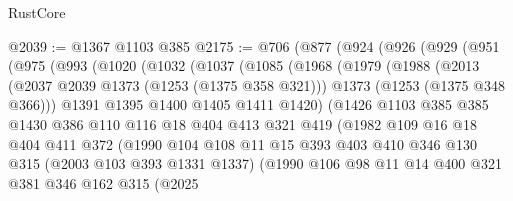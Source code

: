 \begin{lexlean}{RustCore}
\begin{coremodule}
@2039 := @1367 @1103 @385
@2175 := @706
    (@877
      (@924
        (@926
          (@929
            (@951
              (@975
                (@993
                  (@1020
                    (@1032
                      (@1037
                        (@1085
                          (@1968
                            (@1979
                              (@1988
                                (@2013
                                  (@2037 @2039 @1373 (@1253 (@1375 @358 @321)))
                                  @1373
                                  (@1253 (@1375 @348 @366)))
                                @1391
                                @1395
                                @1400
                                @1405
                                @1411
                                @1420)
                              (@1426
                                @1103
                                @385
                                @385
                                @1430
                                @386
                                @110
                                @116
                                @18
                                @404
                                @413
                                @321
                                @419
                                (@1982
                                  @109
                                  @16
                                  @18
                                  @404
                                  @411
                                  @372
                                  (@1990
                                    @104
                                    @108
                                    @11
                                    @15
                                    @393
                                    @403
                                    @410
                                    @346
                                    @130
                                    @315
                                    (@2003 @103 @393 @1331 @1337)
                                    (@1990
                                      @106
                                      @98
                                      @11
                                      @14
                                      @400
                                      @321
                                      @381
                                      @346
                                      @162
                                      @315
                                      (@2025

\end{coremodule}
\end{lexlean}
